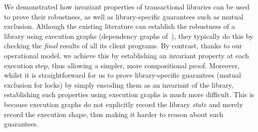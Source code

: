 We demonstrated how invariant properties of transactional libraries can be used to prove their robustness, as well as  library-specific guarantees such as mutual exclusion. 
Although the existing literature can establish the robustness of a library using execution graphs (\eg dependency graphs of~\cite{adya}), they typically do this by checking the \emph{final} results of all its client programs.
By contrast, thanks to our operational model, we achieve this by establishing an invariant property at each execution step, thus allowing a simpler, more compositional proof. 
Moreover, whilst it is straightforward for us to prove library-specific guarantees (\eg mutual exclusion for locks) by simply encoding them as an invariant of the library, 
establishing such properties using execution graphs is much more difficult. 
This is because execution graphs do not explicitly record the library \emph{state} and merely record the execution shape, thus making it harder to reason about such guarantees.


